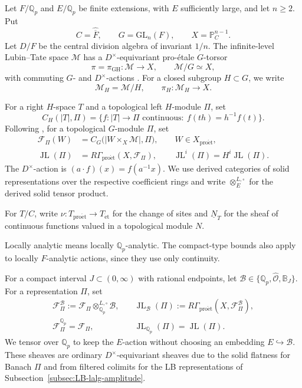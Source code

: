 \documentclass[11pt]{article}
\theoremstyle{definition}
\newcommand{\Qp}{\mathbb Q_p}
\newcommand{\cM}{\mathcal M}
\newcommand{\cF}{\mathcal F}
\newcommand{\Period}{\mathbb P_C^{n-1}}
\newcommand{\proet}{\mathrm{pro\acute et}}
\newcommand{\et}{\mathrm{\acute et}}
\newcommand{\JL}{\operatorname{JL}}
\begin{document}
Let \(F/\Qp\) and \(E/\Qp\) be finite extensions, with
\(E\) sufficiently large, and let \(n\geq2\).  Put
\begin{equation*}
 C=\widehat{\overline F},\qquad
 G=\mathrm{GL}_n(F),\qquad
 X=\Period.
\end{equation*}
Let \(D/F\) be the central division algebra of invariant \(1/n\).
The infinite-level Lubin--Tate space \(\cM\) has a
\(D^\times\)-equivariant pro-\'etale \(G\)-torsor
\begin{equation*}
 \pi=\pi_{\mathrm{GH}}:\cM\longrightarrow X,\qquad
 \cM/G\simeq X,
\end{equation*}
with commuting \(G\)- and \(D^\times\)-actions
\cite[Proposition~4.4.4]{DRC}.  For a closed subgroup
\(H\subset G\), we write
\begin{equation*}
 \cM_H=\cM/H,\qquad \pi_H:\cM_H\longrightarrow X.
\end{equation*}

For a right \(H\)-space \(T\) and a topological left
\(H\)-module \(\Pi\), set
\begin{equation*}
 C_H(|T|,\Pi)=\{f:|T|\to \Pi\text{ continuous}:\
                 f(th)=h^{-1}f(t)\}.
\end{equation*}
Following \cite{DRC}, for a topological \(G\)-module \(\Pi\), set
\begin{align*}
 \cF_\Pi(W)&=C_G\bigl(|W\times_X\cM|,\Pi\bigr),\qquad W\in X_{\proet},\\
 \JL(\Pi)&=R\Gamma_{\proet}(X,\cF_\Pi),\qquad
 \JL^i(\Pi)=H^i\JL(\Pi).
\end{align*}
The \(D^\times\)-action is \((a\cdot f)(x)=f(a^{-1}x)\).
We use derived categories of solid representations over the
respective coefficient rings and write \(\otimes_E^{L,\square}\)
for the derived solid tensor product.

For \(T/C\), write \(\nu:T_{\proet}\to T_{\et}\) for the
change of sites and \(\underline N_T\) for the sheaf of
continuous functions valued in a topological module \(N\).

Locally analytic means locally \(\Qp\)-analytic.
The compact-type bounds also apply to locally \(F\)-analytic
actions, since they use only continuity.

For a compact interval \(J\subset(0,\infty)\) with rational
endpoints, let
\(\mathscr B\in\{\Qp,\widehat{\mathscr O},\mathbb B_J\}\).
For a representation \(\Pi\), set
\begin{align*}
 \cF_\Pi^{\mathscr B}
 :=\cF_\Pi\otimes_{\Qp}^{L,\square}\mathscr B,\quad
 &\JL_{\mathscr B}(\Pi)
 :=R\Gamma_{\proet}(X,\cF_\Pi^{\mathscr B}),\\
 \cF_\Pi^{\Qp}=\cF_\Pi,\quad&\JL_{\Qp}(\Pi)=\JL(\Pi).
\end{align*}
We tensor over \(\Qp\) to keep the \(E\)-action without
choosing an embedding \(E\hookrightarrow\mathscr B\).
These sheaves are ordinary \(D^\times\)-equivariant sheaves due to
the solid flatness for Banach \(\Pi\) \cite[\S2.3.1]{DRC}
and from filtered colimits for the LB representations of
Subsection~\ref{subsec:LB-lalg-amplitude}.
\end{document}
